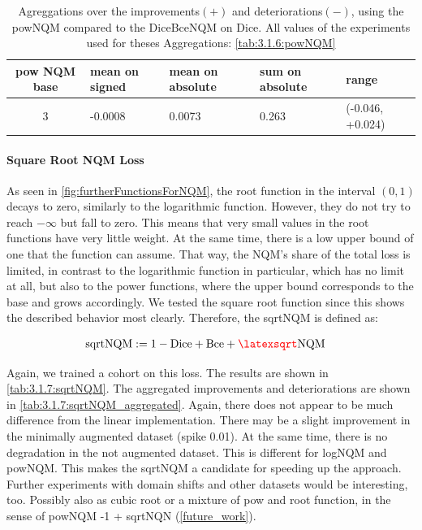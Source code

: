 \begin{table}[h!]
    \centering
    \begin{tabular}{|c|l|l|l|l|}
        \hline
        \bfseries pow NQM base & mean on signed & mean on absolute & sum on absolute & range\\\hline
        3 & -0.0008 & 0.0073 & 0.263 & (-0.046, +0.024)\\\hline
    \end{tabular}
    \caption{Agreggations over the improvements$(+)$ and deteriorations$(-)$, using the powNQM compared to the DiceBceNQM on Dice. All values of the experiments used for theses Aggregations: \autoref{tab:3.1.6:powNQM}}
    \label{tab:3.1.6:powNQM_aggregated}
\end{table}

\iftable

\fi

\paragraph{Square Root NQM Loss}
\label{experiments:03.1.7:backbone_hippo:sqrtNQM}
As seen in \autoref{fig:furtherFunctionsForNQM}, the root function in the interval $(0,1)$ decays to zero, similarly to the logarithmic function. However, they do not try to reach $-\infty$ but fall to zero. This means that very small values in the root functions have very little weight. At the same time, there is a low upper bound of one that the function can assume. That way, the NQM's share of the total loss is limited, in contrast to the logarithmic function in particular, which has no limit at all, but also to the power functions, where the upper bound corresponds to the base and grows accordingly. We tested the square root function since this shows the described behavior most clearly. 
Therefore, the sqrtNQM is defined as:

\begin{align}
    \text{sqrtNQM} &:= 1 - \mathrm{Dice} + \mathrm{Bce} + \sqrtRed{\text{NQM}} 
\end{align}

Again, we trained a cohort on this loss. The results are shown in \autoref{tab:3.1.7:sqrtNQM}. The aggregated improvements and deteriorations are shown in \autoref{tab:3.1.7:sqrtNQM_aggregated}. Again, there does not appear to be much difference from the linear implementation. There may be a slight improvement in the minimally augmented dataset (spike 0.01). At the same time, there is no degradation in the not augmented dataset. This is different for logNQM and powNQM. This makes the sqrtNQM a candidate for speeding up the approach. Further experiments with domain shifts and other datasets would be interesting, too. Possibly also as cubic root or a mixture of pow and root function, in the sense of powNQM -1 + sqrtNQN (\autoref{future_work}). 

